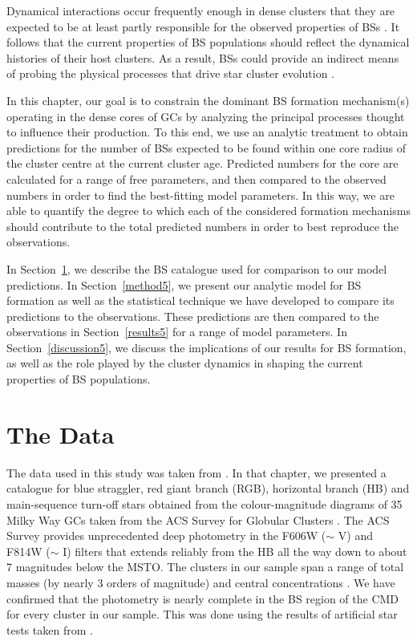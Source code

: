 Dynamical interactions occur frequently enough in dense clusters that
they are expected to be at least partly responsible for the observed
properties of BSs \citep[e.g.][]{stryker93, leigh11b}.  It follows
that the current properties of BS populations
should reflect the dynamical histories of their host clusters.  As a
result, BSs could provide an indirect means of probing
the physical processes that drive star cluster evolution
\citep[e.g.][]{heggie03, hurley05, leigh11b}.

In this chapter, our
goal is to constrain the dominant BS formation mechanism(s) operating
in the dense cores of GCs by analyzing the principal processes
thought to influence their production.  To this end, we
use an analytic treatment to obtain predictions for the number of BSs
expected to be found within one core radius of the cluster centre at
the current cluster age.  Predicted numbers for the core are calculated
for a range of free parameters, and then compared to the
observed numbers in order to find the
best-fitting model parameters.  In this way, we are able to quantify
the degree to which each of the considered formation mechanisms
should contribute to the total predicted numbers in order to
best reproduce the observations.  

In Section~\ref{data5}, we describe the BS catalogue used for comparison
to our model predictions.  In 
Section~\ref{method5}, we present our analytic model for BS 
formation as well as the statistical technique we have developed to
compare its predictions to the observations.  
These predictions are then compared to the observations in
Section~\ref{results5} for a range of model parameters.  In
Section~\ref{discussion5}, we discuss the implications of our results
for BS formation, as well as the role played by the cluster dynamics
in shaping the current properties of BS populations.

\section{The Data} \label{data5}

The data used in this study was taken from \citet{leigh11a}.  In that 
chapter, we presented a catalogue for blue straggler, red giant branch
(RGB), horizontal branch (HB) and main-sequence turn-off stars
obtained from the colour-magnitude diagrams of 35 Milky Way GCs
taken 
from the ACS Survey for Globular Clusters \citep{sarajedini07}.  The
ACS Survey provides unprecedented deep photometry in the F606W ($\sim$
V) and F814W ($\sim$ I) filters
that extends reliably from the HB all the way down to about 7
magnitudes below the MSTO.  The clusters in our sample span a range of
total masses (by nearly 3 orders of magnitude) and central
concentrations \citep{harris96}.  We have confirmed that 
the photometry is nearly complete in the BS region of the CMD for
every cluster in our sample.  This was 
done using the results of artificial star tests taken from
\citet{anderson08}.

